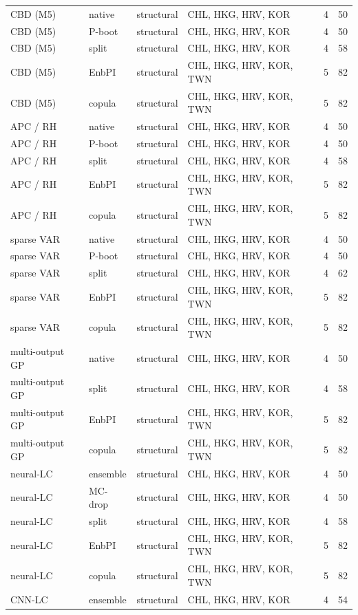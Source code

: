 {\begin{longtable}{@{}llp{1.5cm}p{5.6cm}rr@{}}
CBD (M5) & native & structural & CHL, HKG, HRV, KOR & 4 & 50 \\
CBD (M5) & P-boot & structural & CHL, HKG, HRV, KOR & 4 & 50 \\
CBD (M5) & split & structural & CHL, HKG, HRV, KOR & 4 & 58 \\
CBD (M5) & EnbPI & structural & CHL, HKG, HRV, KOR, TWN & 5 & 82 \\
CBD (M5) & copula & structural & CHL, HKG, HRV, KOR, TWN & 5 & 82 \\
APC / RH & native & structural & CHL, HKG, HRV, KOR & 4 & 50 \\
APC / RH & P-boot & structural & CHL, HKG, HRV, KOR & 4 & 50 \\
APC / RH & split & structural & CHL, HKG, HRV, KOR & 4 & 58 \\
APC / RH & EnbPI & structural & CHL, HKG, HRV, KOR, TWN & 5 & 82 \\
APC / RH & copula & structural & CHL, HKG, HRV, KOR, TWN & 5 & 82 \\
sparse VAR & native & structural & CHL, HKG, HRV, KOR & 4 & 50 \\
sparse VAR & P-boot & structural & CHL, HKG, HRV, KOR & 4 & 50 \\
sparse VAR & split & structural & CHL, HKG, HRV, KOR & 4 & 62 \\
sparse VAR & EnbPI & structural & CHL, HKG, HRV, KOR, TWN & 5 & 82 \\
sparse VAR & copula & structural & CHL, HKG, HRV, KOR, TWN & 5 & 82 \\
multi-output GP & native & structural & CHL, HKG, HRV, KOR & 4 & 50 \\
multi-output GP & split & structural & CHL, HKG, HRV, KOR & 4 & 58 \\
multi-output GP & EnbPI & structural & CHL, HKG, HRV, KOR, TWN & 5 & 82 \\
multi-output GP & copula & structural & CHL, HKG, HRV, KOR, TWN & 5 & 82 \\
neural-LC & ensemble & structural & CHL, HKG, HRV, KOR & 4 & 50 \\
neural-LC & MC-drop & structural & CHL, HKG, HRV, KOR & 4 & 50 \\
neural-LC & split & structural & CHL, HKG, HRV, KOR & 4 & 58 \\
neural-LC & EnbPI & structural & CHL, HKG, HRV, KOR, TWN & 5 & 82 \\
neural-LC & copula & structural & CHL, HKG, HRV, KOR, TWN & 5 & 82 \\
CNN-LC & ensemble & structural & CHL, HKG, HRV, KOR & 4 & 54 \\

\end{longtable}}
